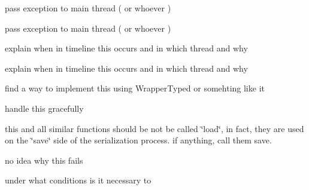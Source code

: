 
\begin{DoxyRefList}
\item[\label{todo__todo000010}%
\hypertarget{todo__todo000010}{}%
\-Member \hyperlink{classgal_1_1network_1_1communicating_abd5efaa6563dda2097f69ae3679f87a1}{gal\-:\-:network\-:\-:communicating\-:\-:thread\-\_\-read} ()]pass exception to main thread ( or whoever )  
\item[\label{todo__todo000009}%
\hypertarget{todo__todo000009}{}%
\-Member \hyperlink{classgal_1_1network_1_1communicating_a271caa9e5d4d13fffda9d38218231b2c}{gal\-:\-:network\-:\-:communicating\-:\-:thread\-\_\-write} (boost\-::shared\-\_\-ptr$<$ message $>$)]pass exception to main thread ( or whoever )  
\item[\label{todo__todo000003}%
\hypertarget{todo__todo000003}{}%
\-Member \hyperlink{classglutpp_1_1Camera_1_1Projection_1_1Base_ac42d1a82122668c3958c586eea0d88d3}{glutpp\-:\-:\-Camera\-:\-:\-Projection\-:\-:\-Base\-:\-:step} (double)]explain when in timeline this occurs and in which thread and why  
\item[\label{todo__todo000004}%
\hypertarget{todo__todo000004}{}%
\-Member \hyperlink{classglutpp_1_1Camera_1_1View_1_1Base_abce83ff7d7f2b50811489ff85cd870c7}{glutpp\-:\-:\-Camera\-:\-:\-View\-:\-:\-Base\-:\-:step} (double)=0]explain when in timeline this occurs and in which thread and why  
\item[\label{todo__todo000007}%
\hypertarget{todo__todo000007}{}%
\-Class \hyperlink{structglutpp_1_1network_1_1actor_1_1update_1_1addr__raw}{glutpp\-:\-:network\-:\-:actor\-:\-:update\-:\-:addr\-\_\-raw} ]find a way to implement this using \-Wrapper\-Typed or somehting like it  
\item[\label{todo__todo000008}%
\hypertarget{todo__todo000008}{}%
\-Member \hyperlink{structglutpp_1_1network_1_1actor_1_1update_1_1addr__raw_a4883db7c0b5227e0fcb124f786a121c1}{glutpp\-:\-:network\-:\-:actor\-:\-:update\-:\-:addr\-\_\-raw\-:\-:load} (\-Archive \&ar, unsigned int const \&version)]handle this gracefully  
\item[\label{todo__todo000006}%
\hypertarget{todo__todo000006}{}%
\-Member \hyperlink{structglutpp_1_1network_1_1actor_1_1update_a2a7bee8209aa582266f5bb4e6e729501}{glutpp\-:\-:network\-:\-:actor\-:\-:update\-:\-:load} (\-Neb\-::weak\-\_\-ptr$<$ glutpp\-::actor\-::actor $>$ const \&actor)]this and all similar functions should be not be called \char`\"{}load\char`\"{}, in fact, they are used on the \char`\"{}save\char`\"{} side of the serialization process. if anything, call them save.  
\item[\label{todo__todo000011}%
\hypertarget{todo__todo000011}{}%
\-Member \hyperlink{classglutpp_1_1scene_1_1desc_a90063754f769b68b932ee7a54c252d69}{glutpp\-:\-:scene\-:\-:desc\-:\-:serialize} (\-Archive \&ar, unsigned int const \&version)]no idea why this fails  
\item[\label{todo__todo000005}%
\hypertarget{todo__todo000005}{}%
\-Namespace \hyperlink{namespaceNeb}{\-Neb} ]under what conditions is it necessary to 


\end{DoxyRefList}
